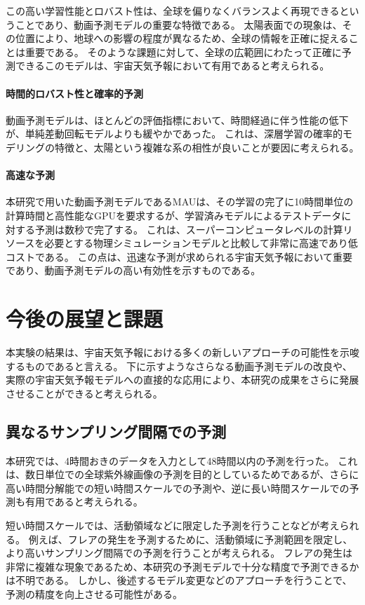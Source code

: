     この高い学習性能とロバスト性は、全球を偏りなくバランスよく再現できるということであり、動画予測モデルの重要な特徴である。
    太陽表面での現象は、その位置により、地球への影響の程度が異なるため、全球の情報を正確に捉えることは重要である。
    そのような課題に対して、全球の広範囲にわたって正確に予測できるこのモデルは、宇宙天気予報において有用であると考えられる。
  
  \paragraph{時間的ロバスト性と確率的予測}
    動画予測モデルは、ほとんどの評価指標において、時間経過に伴う性能の低下が、単純差動回転モデルよりも緩やかであった。
    これは、深層学習の確率的モデリングの特徴と、太陽という複雑な系の相性が良いことが要因に考えられる。
  
  \paragraph{高速な予測}
    本研究で用いた動画予測モデルであるMAUは、その学習の完了に10時間単位の計算時間と高性能なGPUを要求するが、学習済みモデルによるテストデータに対する予測は数秒で完了する。
    これは、スーパーコンピュータレベルの計算リソースを必要とする物理シミュレーションモデルと比較して非常に高速であり低コストである。
    この点は、迅速な予測が求められる宇宙天気予報において重要であり、動画予測モデルの高い有効性を示すものである。

\section{今後の展望と課題}
  本実験の結果は、宇宙天気予報における多くの新しいアプローチの可能性を示唆するものであると言える。
  下に示すようなさらなる動画予測モデルの改良や、実際の宇宙天気予報モデルへの直接的な応用により、本研究の成果をさらに発展させることができると考えられる。
  
  \subsection{異なるサンプリング間隔での予測}
    本研究では、4時間おきのデータを入力として48時間以内の予測を行った。
    これは、数日単位での全球紫外線画像の予測を目的としているためであるが、さらに高い時間分解能での短い時間スケールでの予測や、逆に長い時間スケールでの予測も有用であると考えられる。

    短い時間スケールでは、活動領域などに限定した予測を行うことなどが考えられる。
    例えば、フレアの発生を予測するために、活動領域に予測範囲を限定し、より高いサンプリング間隔での予測を行うことが考えられる。
    フレアの発生は非常に複雑な現象であるため、本研究の予測モデルで十分な精度で予測できるかは不明である。
    しかし、後述するモデル変更などのアプローチを行うことで、予測の精度を向上させる可能性がある。

